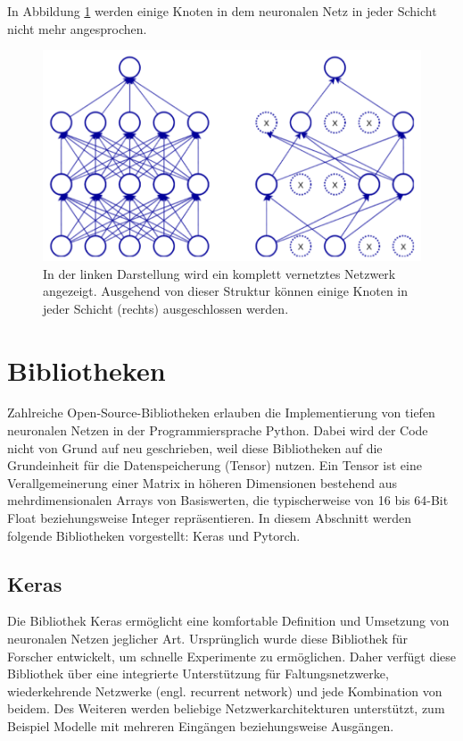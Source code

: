 In Abbildung \ref{dropout} werden einige Knoten in dem neuronalen Netz in jeder Schicht nicht mehr angesprochen.

\begin{figure}[h!]
	\centering
	\includegraphics[width=1\textwidth]{bilder/dropout.PNG}
	\caption{In der linken Darstellung wird ein komplett vernetztes Netzwerk angezeigt. Ausgehend von dieser Struktur können einige Knoten in jeder Schicht (rechts) ausgeschlossen werden\cite{Vasilev2019}.}
	\label{dropout}
\end{figure}

\section{Bibliotheken}
Zahlreiche Open-Source-Bibliotheken erlauben die Implementierung von tiefen neuronalen Netzen in der Programmiersprache Python. Dabei wird der Code nicht von Grund auf neu geschrieben, weil diese Bibliotheken auf die Grundeinheit für die Datenspeicherung (Tensor) nutzen. Ein Tensor ist eine Verallgemeinerung einer Matrix in höheren Dimensionen bestehend aus mehrdimensionalen Arrays von Basiswerten, die typischerweise von 16 bis 64-Bit Float beziehungsweise Integer repräsentieren. In diesem Abschnitt werden folgende Bibliotheken vorgestellt: Keras und Pytorch\cite{Vasilev2019}.


\subsection{Keras}
\label{sec:keras}
Die Bibliothek Keras ermöglicht eine komfortable Definition und Umsetzung von neuronalen Netzen jeglicher Art\cite{francois}. Ursprünglich wurde diese Bibliothek für Forscher entwickelt, um schnelle Experimente zu ermöglichen. Daher verfügt diese Bibliothek über eine integrierte Unterstützung für Faltungsnetzwerke, wiederkehrende Netzwerke (engl. recurrent network) und jede Kombination von beidem. Des Weiteren werden beliebige Netzwerkarchitekturen unterstützt, zum Beispiel Modelle mit mehreren Eingängen
beziehungsweise Ausgängen.

